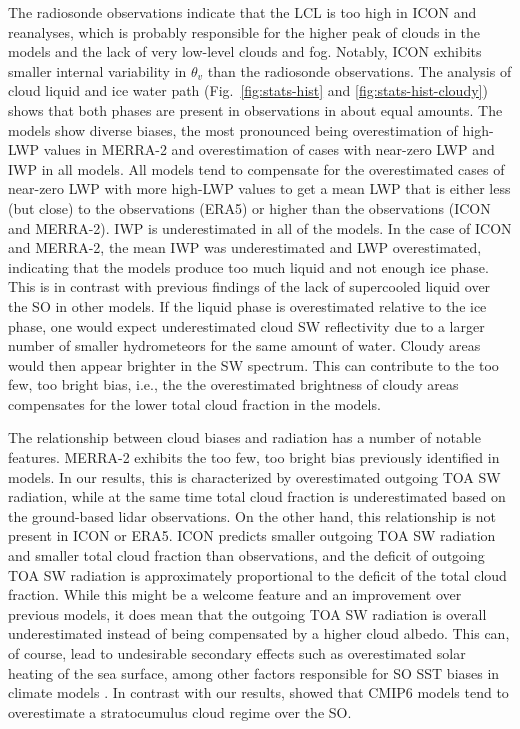 \documentclass[draft]{agujournal2019}
\begin{document}
The radiosonde observations indicate that the LCL is too high in ICON and reanalyses, which is probably responsible for the higher peak of clouds in the models and the lack of very low-level clouds and fog. Notably, ICON exhibits smaller internal variability in $\theta_v$ than the radiosonde observations. The analysis of cloud liquid and ice water path (Fig.~\ref{fig:stats-hist} and \ref{fig:stats-hist-cloudy}) shows that both phases are present in observations in about equal amounts. The models show diverse biases, the most pronounced being overestimation of high-LWP values in MERRA-2 and overestimation of cases with near-zero LWP and IWP in all models. All models tend to compensate for the overestimated cases of near-zero LWP with more high-LWP values to get a mean LWP that is either less (but close) to the observations (ERA5) or higher than the observations (ICON and MERRA-2). IWP is underestimated in all of the models. In the case of ICON and MERRA-2, the mean IWP was underestimated and LWP overestimated, indicating that the models produce too much liquid and not enough ice phase. This is in contrast with previous findings of the lack of supercooled liquid over the SO in other models. If the liquid phase is overestimated relative to the ice phase, one would expect underestimated cloud SW reflectivity due to a larger number of smaller hydrometeors for the same amount of water. Cloudy areas would then appear brighter in the SW spectrum. This can contribute to the too few, too bright bias, i.e., the the overestimated brightness of cloudy areas compensates for the lower total cloud fraction in the models.

The relationship between cloud biases and radiation has a number of notable features. MERRA-2 exhibits the too few, too bright bias previously identified in models. In our results, this is characterized by overestimated outgoing TOA SW radiation, while at the same time total cloud fraction is underestimated based on the ground-based lidar observations. On the other hand, this relationship is not present in ICON or ERA5. ICON predicts smaller outgoing TOA SW radiation and smaller total cloud fraction than observations, and the deficit of outgoing TOA SW radiation is approximately proportional to the deficit of the total cloud fraction. While this might be a welcome feature and an improvement over previous models, it does mean that the outgoing TOA SW radiation is overall underestimated instead of being compensated by a higher cloud albedo. This can, of course, lead to undesirable secondary effects such as overestimated solar heating of the sea surface, among other factors responsible for SO SST biases in climate models \cite{zhang2023,luo2023,hyder2018}. In contrast with our results,  showed that CMIP6 models tend to overestimate a stratocumulus cloud regime over the SO.
\end{document}
